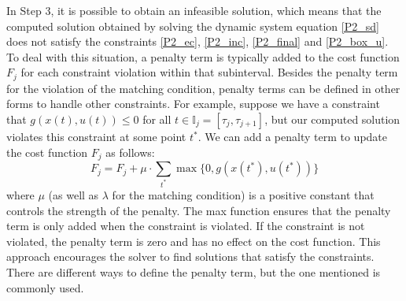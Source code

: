 \documentclass  [
  paper    = a4,
  BCOR     = 10mm,
  twoside,
  fontsize = 12pt,
  fleqn,
  toc      = bibnumbered,
  toc      = listofnumbered,
  numbers  = noendperiod,
  headings = normal,
  listof   = leveldown,
  version  = 3.03
]                                       {scrreprt}
\newcommand{\<}{\langle}
\renewcommand{\>}{\rangle}
\begin{document}
In Step 3, it is possible to obtain an infeasible solution, which means that the computed solution obtained by solving the dynamic system equation \ref{P2_sd} does not satisfy the constraints \ref{P2_ec}, \ref{P2_inc}, \ref{P2_final} and \ref{P2_box_u}. To deal with this situation, a penalty term is typically added to the cost function $F_j$ for each constraint violation within that subinterval. Besides the penalty term for the violation of the matching condition, penalty terms can be defined in other forms to handle other constraints. For example, suppose we have a constraint that $g(x(t), u(t)) \leq 0$ for all $t\in\mathbb{I}_j = [\tau_j, \tau_{j+1}]$, but our computed solution violates this constraint at some point $t^*$. We can add a penalty term to update the cost function $F_j$ as follows:
$$F_j = F_j + \mu \cdot \sum_{t^*}\max\{0, g(x(t^*), u(t^*))\}$$
where $\mu$ (as well as $\lambda$ for the matching condition) is a positive constant that controls the strength of the penalty. The max function ensures that the penalty term is only added when the constraint is violated. If the constraint is not violated, the penalty term is zero and has no effect on the cost function. This approach encourages the solver to find solutions that satisfy the constraints. There are different ways to define the penalty term, but the one mentioned is commonly used. 
\end{document}
